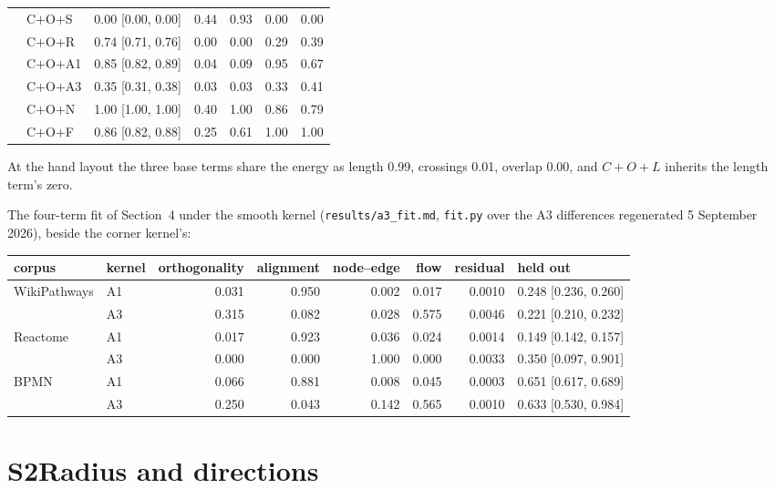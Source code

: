 \documentclass[11pt]{article}
\begin{document}
\begin{center}
\begin{tabular}{llrrrrr}
& C$+$O$+$S & 0.00 [0.00, 0.00] & 0.44 & 0.93 & 0.00 & 0.00 \\
& C$+$O$+$R & 0.74 [0.71, 0.76] & 0.00 & 0.00 & 0.29 & 0.39 \\
& C$+$O$+$A1 & 0.85 [0.82, 0.89] & 0.04 & 0.09 & 0.95 & 0.67 \\
& C$+$O$+$A3 & 0.35 [0.31, 0.38] & 0.03 & 0.03 & 0.33 & 0.41 \\
& C$+$O$+$N & 1.00 [1.00, 1.00] & 0.40 & 1.00 & 0.86 & 0.79 \\
& C$+$O$+$F & 0.86 [0.82, 0.88] & 0.25 & 0.61 & 1.00 & 1.00 \\
\bottomrule
\end{tabular}
\end{center}

At the hand layout the three base terms share the energy as length 0.99, crossings 0.01,
overlap 0.00, and $C{+}O{+}L$ inherits the length term's zero.

The four-term fit of Section~4 under the smooth kernel (\texttt{results/a3\_fit.md},
\texttt{fit.py} over the A3 differences regenerated 5 September 2026), beside the corner
kernel's:

\begin{center}\footnotesize
\begin{tabular}{llrrrrrl}
\toprule
corpus & kernel & orthogonality & alignment & node--edge & flow & residual & held out \\
\midrule
WikiPathways & A1 & 0.031 & 0.950 & 0.002 & 0.017 & 0.0010 & 0.248 [0.236, 0.260] \\
 & A3 & 0.315 & 0.082 & 0.028 & 0.575 & 0.0046 & 0.221 [0.210, 0.232] \\
Reactome & A1 & 0.017 & 0.923 & 0.036 & 0.024 & 0.0014 & 0.149 [0.142, 0.157] \\
 & A3 & 0.000 & 0.000 & 1.000 & 0.000 & 0.0033 & 0.350 [0.097, 0.901] \\
BPMN & A1 & 0.066 & 0.881 & 0.008 & 0.045 & 0.0003 & 0.651 [0.617, 0.689] \\
 & A3 & 0.250 & 0.043 & 0.142 & 0.565 & 0.0010 & 0.633 [0.530, 0.984] \\
\bottomrule
\end{tabular}
\end{center}



\section*{S2\quad Radius and directions}
\end{document}
